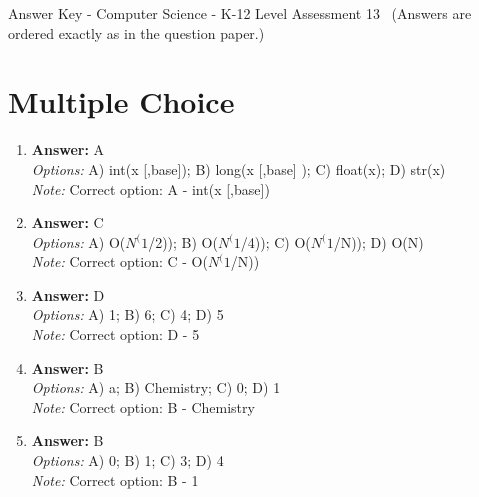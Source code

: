\documentclass[12pt]{article}
\begin{document}
\begin{center}
Answer Key - Computer Science - K-12 Level Assessment 13 \
\small (Answers are ordered exactly as in the question paper.)
\end{center}

\section*{Multiple Choice}
\begin{enumerate}[label=\arabic*.]
\item \textbf{Answer:} A
\\ \textit{Options:} A) int(x [,base]); B) long(x [,base] ); C) float(x); D) str(x)
\\ \textit{Note:} Correct option: A - int(x [,base])
\item \textbf{Answer:} C
\\ \textit{Options:} A) O($N^(1$/2)); B) O($N^(1$/4)); C) O($N^(1$/N)); D) O(N)
\\ \textit{Note:} Correct option: C - O($N^(1$/N))
\item \textbf{Answer:} D
\\ \textit{Options:} A) 1; B) 6; C) 4; D) 5
\\ \textit{Note:} Correct option: D - 5
\item \textbf{Answer:} B
\\ \textit{Options:} A) a; B) Chemistry; C) 0; D) 1
\\ \textit{Note:} Correct option: B - Chemistry
\item \textbf{Answer:} B
\\ \textit{Options:} A) 0; B) 1; C) 3; D) 4
\\ \textit{Note:} Correct option: B - 1
\end{enumerate}
\end{document}
